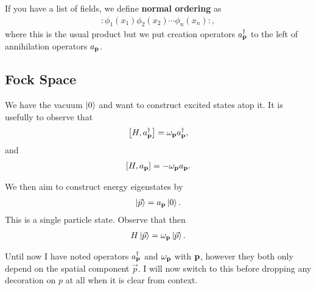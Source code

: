 \begin{definition}
    If you have a list of fields, we define \textbf{normal ordering} as
    \begin{align}
        :\phi_1 \left( x_1 \right) \phi_2 \left( x_2 \right) \cdots \phi_{n}\left( x_{n} \right) :
    ,\end{align}
    where this is the usual product but we put creation operators $a^{\dag}_{\vb{p}}$ to the left of annihilation operators $a_{\vb{p}}$.
\end{definition}

\subsection{Fock Space}

We have the vacuum $\ket{0}$ and want to construct excited states atop it. It is usefully to observe that
\begin{align}
    \left[ H, a^{\dag}_{\vb{p}} \right] = \omega_{\vb{p}} a_{\vb{p}}^{\dag}
,\end{align}
and
\begin{align}
    \left[ H, a_{\vb{p}} \right] = - \omega_{\vb{p}} a_{\vb{p}}
.\end{align}

We then aim to construct energy eigenstates by
\begin{align}
    \ket{\vec{p}} = a_{\vb{p}} \ket{0}
.\end{align}
This is a single particle state. Observe that then
\begin{align}
    H \ket{\vec{p}} = \omega_{\vb{p}} \ket{\vec{p}}
.\end{align}

\begin{note}
    Until now I have noted operators $a^{\dag}_{\vb{p}}$ and $\omega_{\vb{p}}$ with $\vb{p}$, however they both only depend on the spatial component $\vec{p}$. I will now switch to this before dropping any decoration on $p$ at all when it is clear from context.
\end{note}

